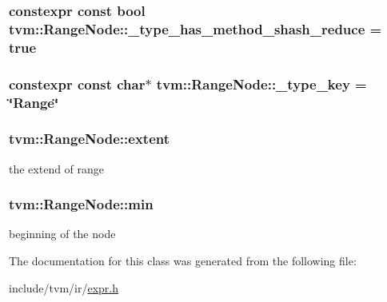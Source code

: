 \subsubsection[{\texorpdfstring{\+\_\+type\+\_\+has\+\_\+method\+\_\+shash\+\_\+reduce}{_type_has_method_shash_reduce}}]{\setlength{\rightskip}{0pt plus 5cm}constexpr const bool tvm\+::\+Range\+Node\+::\+\_\+type\+\_\+has\+\_\+method\+\_\+shash\+\_\+reduce = true\hspace{0.3cm}{\ttfamily [static]}}\hypertarget{classtvm_1_1RangeNode_abdc5325a297420fca1f083ee295f7dcf}{}\label{classtvm_1_1RangeNode_abdc5325a297420fca1f083ee295f7dcf}
\subsubsection[{\texorpdfstring{\+\_\+type\+\_\+key}{_type_key}}]{\setlength{\rightskip}{0pt plus 5cm}constexpr const char$\ast$ tvm\+::\+Range\+Node\+::\+\_\+type\+\_\+key = \char`\"{}Range\char`\"{}\hspace{0.3cm}{\ttfamily [static]}}\hypertarget{classtvm_1_1RangeNode_a65cbd1aa0dbb91e13a960b927327295d}{}\label{classtvm_1_1RangeNode_a65cbd1aa0dbb91e13a960b927327295d}
\subsubsection[{\texorpdfstring{extent}{extent}}]{ tvm\+::\+Range\+Node\+::extent}\hypertarget{classtvm_1_1RangeNode_acd2ddcfab1f591a6c1f2568dd0180845}{}\label{classtvm_1_1RangeNode_acd2ddcfab1f591a6c1f2568dd0180845}


the extend of range 

\subsubsection[{\texorpdfstring{min}{min}}]{ tvm\+::\+Range\+Node\+::min}\hypertarget{classtvm_1_1RangeNode_a43d2fb12bb61cf05936a1972d0158b49}{}\label{classtvm_1_1RangeNode_a43d2fb12bb61cf05936a1972d0158b49}


beginning of the node 



The documentation for this class was generated from the following file\+:\begin{DoxyCompactItemize}
\item 
include/tvm/ir/\hyperlink{ir_2expr_8h}{expr.\+h}\end{DoxyCompactItemize}
